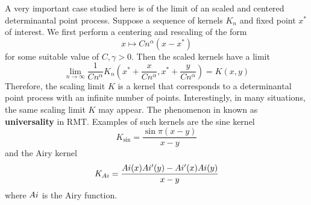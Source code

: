 A very important case studied here is of the limit of an scaled and centered determinantal point process. Suppose a sequence of kernels $K_n$ and fixed point $x^*$ of interest. We first perform a centering and rescaling of the form
\begin{equation}
	x \mapsto Cn^\alpha (x - x^*)
\end{equation} 
for some suitable value of $C, \gamma > 0$. Then the scaled kernels have a limit
\begin{equation}
	\lim_{n \rightarrow \infty} \frac{1}{C n^\alpha} K_n \left( x^* + \frac{x}{C n^\alpha}, x^* + \frac{y}{C n^\alpha} \right) = K(x, y)
\end{equation}
Therefore, the scaling limit $K$ is a kernel that corresponds to a determinantal point process with
an infinite number of points.  Interestingly, in many situations, the same scaling limit $K$ may appear. The phenomenon in known as \textbf{universality} in RMT. Examples of such kernels are the sine kernel
\begin{equation}
	K_{\sin} = \frac{\sin \pi(x - y)}{x - y}
\end{equation}
and the Airy kernel
\begin{equation}
	K_{Ai} = \frac{Ai(x)Ai'(y) - Ai'(x) Ai(y)}{x - y}
\end{equation}
where $Ai$ is the Airy function.